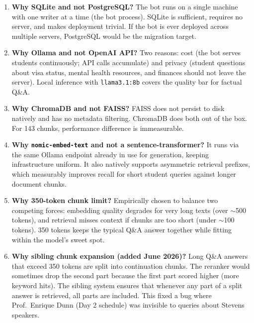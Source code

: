 \documentclass[12pt,letterpaper]{article}
\begin{document}
\begin{enumerate}[leftmargin=2em]
  \item \textbf{Why SQLite and not PostgreSQL?} The bot runs on a single
        machine with one writer at a time (the bot process). SQLite is
        sufficient, requires no server, and makes deployment trivial. If
        the bot is ever deployed across multiple servers, PostgreSQL would
        be the migration target.

  \item \textbf{Why Ollama and not OpenAI API?} Two reasons: cost (the
        bot serves students continuously; API calls accumulate) and privacy
        (student questions about visa status, mental health resources, and
        finances should not leave the server). Local inference with
        \texttt{llama3.1:8b} covers the quality bar for factual Q\&A.

  \item \textbf{Why ChromaDB and not FAISS?} FAISS does not persist
        to disk natively and has no metadata filtering. ChromaDB does both
        out of the box. For 143 chunks, performance difference is
        immeasurable.

  \item \textbf{Why \texttt{nomic-embed-text} and not a sentence-transformer?}
        It runs via the same Ollama endpoint already in use for generation,
        keeping infrastructure uniform. It also natively supports asymmetric
        retrieval prefixes, which measurably improves recall for short
        student queries against longer document chunks.

  \item \textbf{Why 350-token chunk limit?} Empirically chosen to balance
        two competing forces: embedding quality degrades for very long texts
        (over $\sim$500 tokens), and retrieval misses context if chunks are
        too short (under $\sim$100 tokens). 350 tokens keeps the typical
        Q\&A answer together while fitting within the model's sweet spot.

  \item \textbf{Why sibling chunk expansion (added June 2026)?} Long Q\&A
        answers that exceed 350 tokens are split into continuation chunks.
        The reranker would sometimes drop the second part because the first
        part scored higher (more keyword hits). The sibling system ensures
        that whenever any part of a split answer is retrieved, all parts
        are included. This fixed a bug where Prof.\ Enrique Dunn (Day 2
        schedule) was invisible to queries about Stevens speakers.


\end{enumerate}
\end{document}
